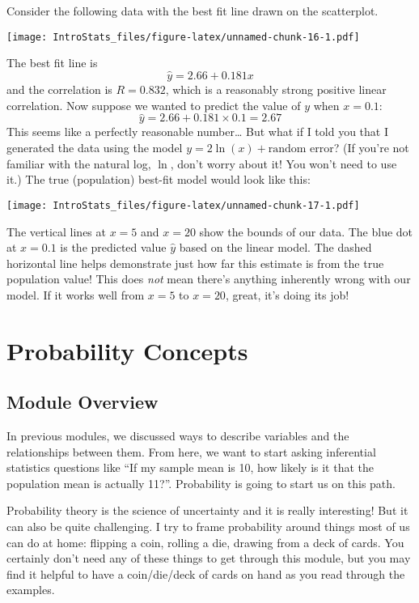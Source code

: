 \documentclass[
]{book}
\begin{document}
Consider the following data with the best fit line drawn on the scatterplot.

\texttt{[image: IntroStats\_files/figure-latex/unnamed-chunk-16-1.pdf]}

The best fit line is \[\hat{y} = 2.66 + 0.181x\] and the correlation is \(R=0.832\), which is a reasonably strong positive linear correlation. Now suppose we wanted to predict the value of \(y\) when \(x=0.1\): \[\hat{y} = 2.66 + 0.181\times0.1 = 2.67\] This seems like a perfectly reasonable number\ldots{} But what if I told you that I generated the data using the model \(y = 2\ln(x) + \text{random error}\)? (If you're not familiar with the natural log, \(\ln\), don't worry about it! You won't need to use it.) The true (population) best-fit model would look like this:

\texttt{[image: IntroStats\_files/figure-latex/unnamed-chunk-17-1.pdf]}

The vertical lines at \(x=5\) and \(x=20\) show the bounds of our data. The blue dot at \(x=0.1\) is the predicted value \(\hat{y}\) based on the linear model. The dashed horizontal line helps demonstrate just how far this estimate is from the true population value! This does \emph{not} mean there's anything inherently wrong with our model. If it works well from \(x=5\) to \(x=20\), great, it's doing its job!

\hypertarget{probability-concepts}{%
\chapter{Probability Concepts}\label{probability-concepts}}

\hypertarget{module-overview-2}{%
\section{Module Overview}\label{module-overview-2}}

In previous modules, we discussed ways to describe variables and the relationships between them. From here, we want to start asking inferential statistics questions like ``If my sample mean is 10, how likely is it that the population mean is actually 11?''. Probability is going to start us on this path.

Probability theory is the science of uncertainty and it is really interesting! But it can also be quite challenging. I try to frame probability around things most of us can do at home: flipping a coin, rolling a die, drawing from a deck of cards. You certainly don't need any of these things to get through this module, but you may find it helpful to have a coin/die/deck of cards on hand as you read through the examples.
\end{document}
